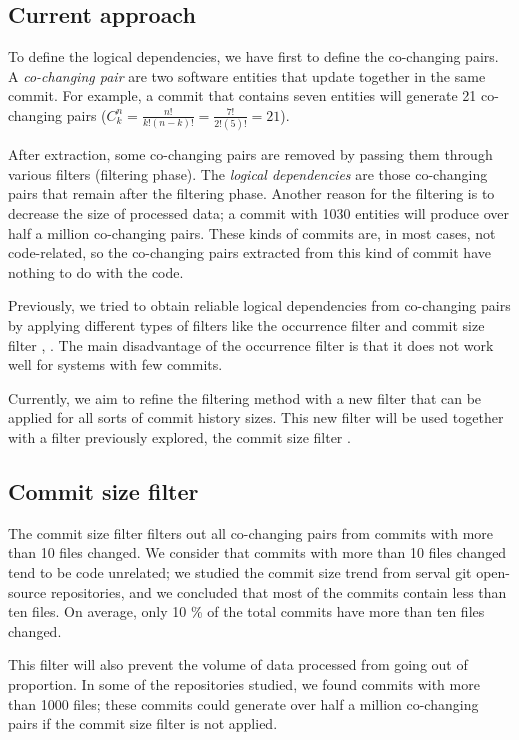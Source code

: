 \documentclass[runningheads]{comsis2}
\newcommand*{\Comb}[2]{{}C^{#1}_{#2}}%
\begin{document}
\subsection{Current approach}

To define the logical dependencies, we have first to define the co-changing pairs. A \textit{co-changing pair} are two software entities that update together in the same commit. For example, a commit that contains seven entities will generate 21 co-changing pairs ($\Comb{n}{k}=\frac{n!}{k!(n-k)!} = \frac{7!}{2!(5)!} = 21$).


After extraction, some co-changing pairs are removed by passing them through various filters (filtering phase). The \textit{logical dependencies} are those co-changing pairs that remain after the filtering phase. Another reason for the filtering is to decrease the size of processed data; a commit with 1030 entities will produce over half a million co-changing pairs. These kinds of commits are, in most cases, not code-related, so the co-changing pairs extracted from this kind of commit have nothing to do with the code.

Previously, we tried to obtain reliable logical dependencies from co-changing pairs by applying different types of filters like the occurrence filter and commit size filter \cite{saci19}, \cite{enase19}. The main disadvantage of the occurrence filter is that it does not work well for systems with few commits.

Currently, we aim to refine the filtering method with a new filter that can be applied for all sorts of commit history sizes. This new filter will be used together with a filter previously explored, the commit size filter \cite{enase19}.


\subsection{Commit size filter}

The commit size filter filters out all co-changing pairs from commits with more than 10 files changed. We consider that commits with more than 10 files changed tend to be code unrelated; we studied the commit size trend from serval git open-source repositories, and we concluded that most of the commits contain less than ten files. On average, only 10 \% of the total commits have more than ten files changed. 

This filter will also prevent the volume of data processed from going out of proportion. In some of the repositories studied, we found commits with more than 1000 files; these commits could generate over half a million co-changing pairs if the commit size filter is not applied. 
\end{document}
